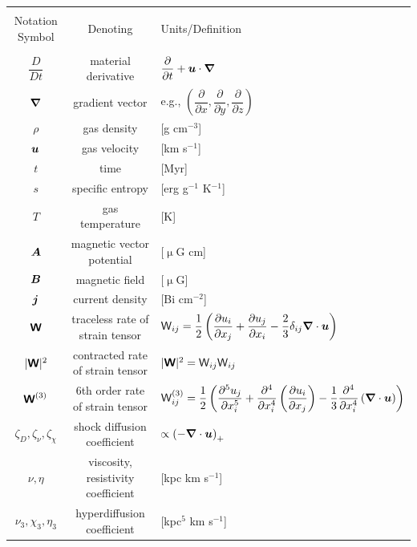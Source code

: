 \documentclass[preprint2]{aastex63}
\newcommand{\vect}[1]{{{\mbox{\boldmath $#1$}}}}%
\newcommand{\mathbfss}[1]{\textbf{\textsf{#1}}}
\begin{document}
\begin{table}[h]
\begin{tabular}{ccl}
\hline\hline\\
{Notation Symbol} & {Denoting} & {Units/Definition}\\\hline\\
 $\dfrac{D}{Dt}$ & material derivative & $\dfrac{\partial }{\partial t}+\vect{u}\cdot \vect\nabla$ \\
 $\vect\nabla$ & gradient vector & e.g., $\left(\dfrac{\partial }{\partial x},\dfrac{\partial }{\partial y},\dfrac{\partial }{\partial z}\right)$ \\
 $\rho$ & gas density & [g cm$^{-3}$]  \\
 $\vect u$ & gas velocity & [km s$^{-1}$] \\
 $t$ & time & [Myr] \\
 $s$ & specific entropy & [erg g$^{-1}$ K$^{-1}$] \\
 $T$ & gas temperature & [K] \\
 $\vect A$ & magnetic vector potential & [$\upmu$G cm] \\
 $\vect B$ & magnetic field & [$\upmu$G] \\
 $\vect j$ & current density & [Bi cm$^{-2}$] \\
 $\mathbfss W$ & traceless rate of strain tensor &
   ${\mathsf W}_{ij} = \dfrac{1}{2}\left(\dfrac{\partial u_i}{\partial x_j}
                  + \dfrac{\partial u_j}{\partial x_i}
                  -\dfrac{2}{3} \delta_{ij}\vect\nabla\cdot \vect u\right)$ \\
 $|\mathbfss W|^2$ & contracted rate of strain tensor &
   $|\mathbfss W|^2={\mathsf W}_{ij}{\mathsf W}_{ij}$\\
 $\mathbfss W^{(3)}$ & 6th order rate of strain tensor &
   ${\mathsf W}_{ij}^{(3)} = \dfrac{1}{2}\left(\dfrac{\partial^5 u_j}{\partial x_i^5}
                  + \dfrac{\partial^4}{\partial x_i^4}\left(\dfrac{\partial u_i}{\partial x_j}\right)
                  -\dfrac{1}{3}\dfrac{\partial^4}{\partial x_i^4}\left(\vect\nabla\cdot \vect u\right)\right)$ \\
 $\zeta_{D},\zeta_{\nu},\zeta_{\chi}$ & shock diffusion coefficient& $\propto \left(-\vect\nabla\cdot\vect u\right)_+$\\
 $\nu,\eta$ & viscosity, resistivity coefficient& [kpc km s$^{-1}$]\\
 $\nu_3,\chi_3,\eta_3$ & hyperdiffusion coefficient& [kpc$^{5}$ km s$^{-1}$]\\

\end{tabular}
\end{table}
\end{document}
